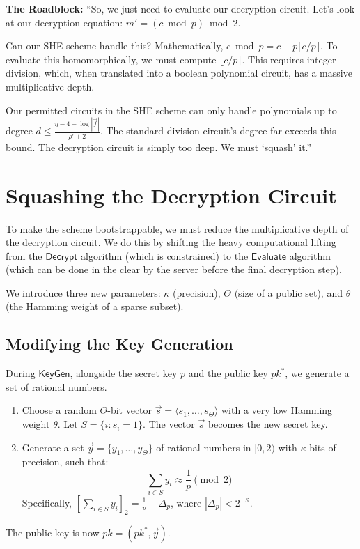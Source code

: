 \documentclass[11pt]{article}
\begin{document}
\begin{speakernote}
\textbf{The Roadblock:}
``So, we just need to evaluate our decryption circuit. Let's look at our decryption equation: $m' = (c \bmod p) \bmod 2$. 

Can our SHE scheme handle this? Mathematically, $c \bmod p = c - p \lfloor c/p \rceil$. To evaluate this homomorphically, we must compute $\lfloor c/p \rceil$. This requires integer division, which, when translated into a boolean polynomial circuit, has a massive multiplicative depth. 

Our permitted circuits in the SHE scheme can only handle polynomials up to degree $d \le \frac{\eta - 4 - \log|\vec{f}|}{\rho' + 2}$. The standard division circuit's degree far exceeds this bound. The decryption circuit is simply too deep. We must `squash' it.''
\end{speakernote}

\section{Squashing the Decryption Circuit}

To make the scheme bootstrappable, we must reduce the multiplicative depth of the decryption circuit. We do this by shifting the heavy computational lifting from the $\mathsf{Decrypt}$ algorithm (which is constrained) to the $\mathsf{Evaluate}$ algorithm (which can be done in the clear by the server before the final decryption step).

We introduce three new parameters: $\kappa$ (precision), $\Theta$ (size of a public set), and $\theta$ (the Hamming weight of a sparse subset).

\subsection{Modifying the Key Generation}
During $\mathsf{KeyGen}$, alongside the secret key $p$ and the public key $pk^*$, we generate a set of rational numbers.
\begin{enumerate}
    \item Choose a random $\Theta$-bit vector $\vec{s} = \langle s_1, \dots, s_\Theta \rangle$ with a very low Hamming weight $\theta$. Let $S = \{i : s_i = 1\}$. The vector $\vec{s}$ becomes the new secret key.
    \item Generate a set $\vec{y} = \{y_1, \dots, y_\Theta\}$ of rational numbers in $[0, 2)$ with $\kappa$ bits of precision, such that:
    \begin{equation}
        \sum_{i \in S} y_i \approx \frac{1}{p} \pmod 2
    \end{equation}
    Specifically, $\left[ \sum_{i \in S} y_i \right]_2 = \frac{1}{p} - \Delta_p$, where $|\Delta_p| < 2^{-\kappa}$.
\end{enumerate}
The public key is now $pk = (pk^*, \vec{y})$.
\end{document}
